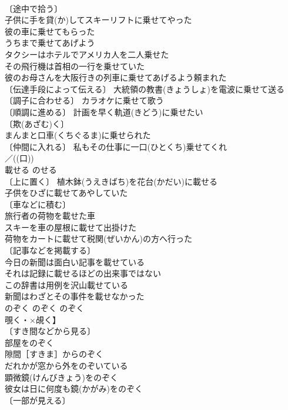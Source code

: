\documentclass[8pt]{extreport}
\begin{document}
\begin{CJK}{UTF8}{min}
\\	〔途中で拾う〕
\\	子供に手を貸(か)してスキーリフトに乗せてやった 
\\	彼の車に乗せてもらった 
\\	うちまで乗せてあげよう 
\\	タクシーはホテルでアメリカ人を二人乗せた 
\\	その飛行機は首相の一行を乗せていた 
\\	彼のお母さんを大阪行きの列車に乗せてあげるよう頼まれた 
\\	〔伝達手段によって伝える〕 大統領の教書(きょうしょ)を電波に乗せて送る 
\\	〔調子に合わせる〕 カラオケに乗せて歌う 
\\	〔順調に進める〕 計画を早く軌道(きどう)に乗せたい 
\\	〔欺(あざむ)く〕
\\	まんまと口車(くちぐるま)に乗せられた 
\\	〔仲間に入れる〕 私もその仕事に一口(ひとくち)乗せてくれ 
\\	／((口)) 
\\	載せる	のせる	
\\	〔上に置く〕 植木鉢(うえきばち)を花台(かだい)に載せる 
\\	子供をひざに載せてあやしていた 
\\	〔車などに積む〕
\\	旅行者の荷物を載せた車 
\\	スキーを車の屋根に載せて出掛けた 
\\	荷物をカートに載せて税関(ぜいかん)の方へ行った 
\\	〔記事などを掲載する〕
\\	今日の新聞は面白い記事を載せている 
\\	それは記録に載せるほどの出来事ではない 
\\	この辞書は用例を沢山載せている 
\\	新聞はわざとその事件を載せなかった 
\\	のぞく	のぞく	のぞく
\\	覗く・×覘く】 
\\	〔すき間などから見る〕
\\	部屋をのぞく 
\\	隙間［すきま］からのぞく 
\\	だれかが窓から外をのぞいている 
\\	顕微鏡(けんびきょう)をのぞく 
\\	彼女は日に何度も鏡(かがみ)をのぞく 
\\	〔一部が見える〕

\end{CJK}
\end{document}
